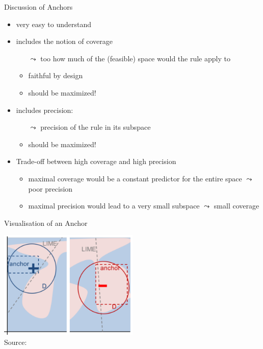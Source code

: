 \documentclass[aspectratio=169]{../latex_main/tntbeamer}  %
\begin{document}

\begin{frame}[c]{Discussion of Anchors}

\begin{itemize}
    \item very easy to understand
    \smallskip
    \pause
    \item includes the notion of coverage
    \begin{itemize}
        \item[$\leadsto$] too how much of the (feasible) space would the rule apply to
        \item faithful by design
        \item should be maximized!
    \end{itemize}
    \smallskip
    \pause
    \item includes precision:
    \begin{itemize}
        \item[$\leadsto$] precision of the rule in its subspace
        \item should be maximized!
    \end{itemize}
    \smallskip
    \pause
    \item Trade-off between high coverage and high precision
    \begin{itemize}
        \item maximal coverage would be a constant predictor for the entire space $\leadsto$ poor precision
        \item maximal precision would lead to a very small subspace $\leadsto$ small coverage
    \end{itemize}
    
\end{itemize}


\end{frame}


\begin{frame}[c]{Visualisation of an Anchor}

\centering
\includegraphics[width=0.5\textwidth]{04_local_explanations/figure/anchors-visualization_orig.png}\\
Source: 

\end{frame}
\end{document}

